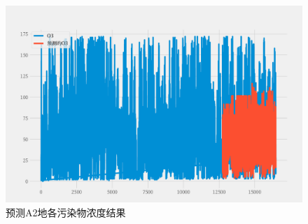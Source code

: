 \documentclass[a4paper,10pt]{my_paper}
\numberwithin{equation}{section}
\begin{document}
\begin{figure}[htbp]
\begin{minipage}[c]{0.3\textwidth}
		\end{minipage}
    \begin{minipage}[c]{0.3\textwidth}
			\centering
			\includegraphics[width=1\textwidth]{prob4/预测A2地_O3.pdf} 
		\end{minipage}
\caption{预测A2地各污染物浓度结果}\label{fig_Q4A2地预测图}
\end{figure}
\end{document}
